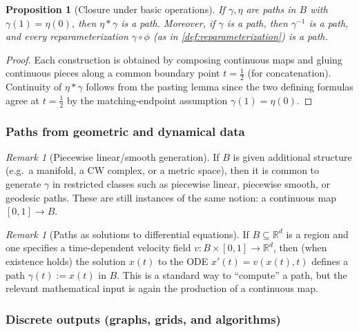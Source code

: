 \documentclass[11pt,a4paper]{article}
\newtheorem{proposition}[theorem]{Proposition}
\theoremstyle{definition}
\theoremstyle{remark}
\newtheorem{remark}[theorem]{Remark}
\begin{document}
\begin{proposition}[Closure under basic operations]
\label{prop:path-ops-closed}
If \(\gamma,\eta\) are paths in \(B\) with \(\gamma(1)=\eta(0)\), then \(\eta*\gamma\) is a path. Moreover, if \(\gamma\) is a path, then \(\gamma^{-1}\) is a path, and every reparameterization \(\gamma\circ\phi\) (as in \cref{def:reparameterization}) is a path.
\end{proposition}

\begin{proof}
Each construction is obtained by composing continuous maps and gluing continuous pieces along a common boundary point \(t=\tfrac12\) (for concatenation). Continuity of \(\eta*\gamma\) follows from the pasting lemma since the two defining formulas agree at \(t=\tfrac12\) by the matching-endpoint assumption \(\gamma(1)=\eta(0)\).
\end{proof}

\subsubsection{Paths from geometric and dynamical data}
\label{sec:geometric-dynamical}

\begin{remark}[Piecewise linear/smooth generation]
\label{rem:pl-ps}
If \(B\) is given additional structure (e.g.\ a manifold, a CW complex, or a metric space), then it is common to generate \(\gamma\) in restricted classes such as piecewise linear, piecewise smooth, or geodesic paths. These are still instances of the same notion: a continuous map \([0,1]\to B\).
\end{remark}

\begin{remark}[Paths as solutions to differential equations]
\label{rem:ode-path}
If \(B\subseteq \mathbb{R}^d\) is a region and one specifies a time-dependent velocity field \(v:B\times[0,1]\to \mathbb{R}^d\), then (when existence holds) the solution \(x(t)\) to the ODE \(x'(t)=v(x(t),t)\) defines a path \(\gamma(t):=x(t)\) in \(B\). This is a standard way to ``compute'' a path, but the relevant mathematical input is again the production of a continuous map.
\end{remark}

\subsubsection{Discrete outputs (graphs, grids, and algorithms)}
\label{sec:discrete-to-continuous}
\end{document}

